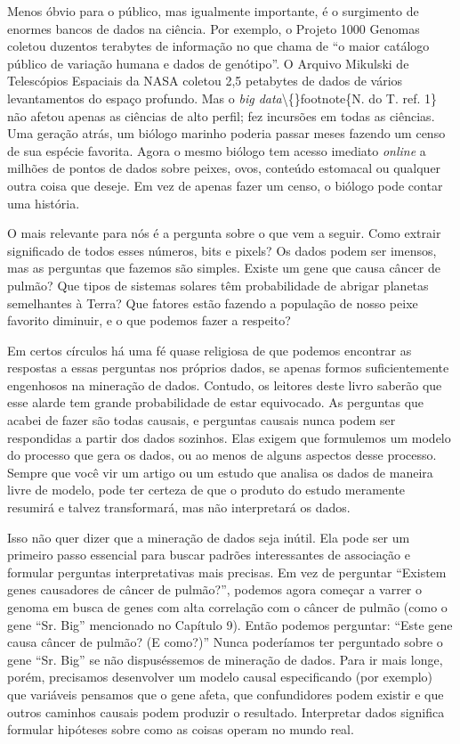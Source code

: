 \documentclass[11pt,a5paper,twoside]{book}
\begin{document}
Menos óbvio para o público, mas igualmente importante, é o surgimento de enormes bancos de dados na ciência. Por exemplo, o Projeto 1000 Genomas coletou duzentos terabytes de informação no que chama de “o maior catálogo público de variação humana e dados de genótipo”. O Arquivo Mikulski de Telescópios Espaciais da NASA coletou 2,5 petabytes de dados de vários levantamentos do espaço profundo. Mas o \textit{big data}\textbackslash\{\}footnote\{N. do T. ref. 1\} não afetou apenas as ciências de alto perfil; fez incursões em todas as ciências. Uma geração atrás, um biólogo marinho poderia passar meses fazendo um censo de sua espécie favorita. Agora o mesmo biólogo tem acesso imediato \textit{online} a milhões de pontos de dados sobre peixes, ovos, conteúdo estomacal ou qualquer outra coisa que deseje. Em vez de apenas fazer um censo, o biólogo pode contar uma história.

O mais relevante para nós é a pergunta sobre o que vem a seguir. Como extrair significado de todos esses números, bits e pixels? Os dados podem ser imensos, mas as perguntas que fazemos são simples. Existe um gene que causa câncer de pulmão? Que tipos de sistemas solares têm probabilidade de abrigar planetas semelhantes à Terra? Que fatores estão fazendo a população de nosso peixe favorito diminuir, e o que podemos fazer a respeito?

Em certos círculos há uma fé quase religiosa de que podemos encontrar as respostas a essas perguntas nos próprios dados, se apenas formos suficientemente engenhosos na mineração de dados. Contudo, os leitores deste livro saberão que esse alarde tem grande probabilidade de estar equivocado. As perguntas que acabei de fazer são todas causais, e perguntas causais nunca podem ser respondidas a partir dos dados sozinhos. Elas exigem que formulemos um modelo do processo que gera os dados, ou ao menos de alguns aspectos desse processo. Sempre que você vir um artigo ou um estudo que analisa os dados de maneira livre de modelo, pode ter certeza de que o produto do estudo meramente resumirá e talvez transformará, mas não interpretará os dados.

Isso não quer dizer que a mineração de dados seja inútil. Ela pode ser um primeiro passo essencial para buscar padrões interessantes de associação e formular perguntas interpretativas mais precisas. Em vez de perguntar “Existem genes causadores de câncer de pulmão?”, podemos agora começar a varrer o genoma em busca de genes com alta correlação com o câncer de pulmão (como o gene “Sr. Big” mencionado no Capítulo 9). Então podemos perguntar: “Este gene causa câncer de pulmão? (E como?)” Nunca poderíamos ter perguntado sobre o gene “Sr. Big” se não dispuséssemos de mineração de dados. Para ir mais longe, porém, precisamos desenvolver um modelo causal especificando (por exemplo) que variáveis pensamos que o gene afeta, que confundidores podem existir e que outros caminhos causais podem produzir o resultado. Interpretar dados significa formular hipóteses sobre como as coisas operam no mundo real.
\end{document}
